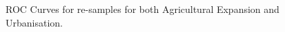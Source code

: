 

% 



% 
% 


\begin{figure}[h!]
 \caption{ROC Curves for re-samples for both Agricultural Expansion and Urbanisation.}
 \label{fig:roc_rs}
\end{figure}

